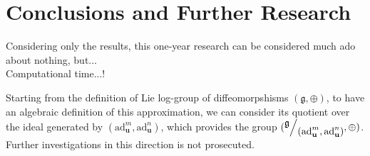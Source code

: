 \section{Conclusions and Further Research}\label{ch:conclusions}


Considering only the results, this one-year research can be considered much ado about nothing, but...\\
Computational time...!

Starting from the definition of Lie log-group of diffeomorpshisms $(\mathfrak{g} , \oplus)$, to have an algebraic definition of this approximation, we can consider its quotient over the ideal generated by $(\text{ad}_{\mathbf{u}}^{m}, \text{ad}_{\mathbf{u}}^{n})$, which provides the group $(\quotient{\mathfrak{g}}{(\text{ad}_{\mathbf{u}}^{m}, \text{ad}_{\mathbf{u}}^{n})}, \oplus)$. Further investigations in this direction is not prosecuted.
